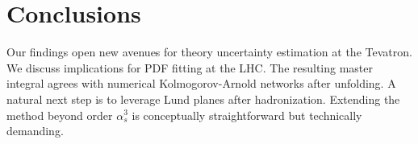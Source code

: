 \section{Conclusions}\label{sec:conclusions}

Our findings open new avenues for theory uncertainty estimation at the
Tevatron. We discuss implications for PDF fitting at the LHC. The
resulting master integral agrees with numerical Kolmogorov-Arnold
networks after unfolding. A natural next step is to leverage Lund planes
after hadronization. Extending the method beyond order $\alpha_s^3$ is
conceptually straightforward but technically demanding.

